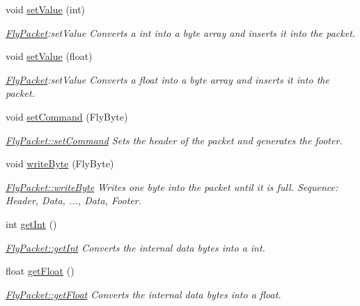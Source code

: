 \begin{DoxyCompactItemize}
void \hyperlink{class_fly_packet_ab3d6f9ed138f3938dc97a510e050f1dc}{set\+Value} (int)
\begin{DoxyCompactList}\small\item\em \hyperlink{class_fly_packet}{Fly\+Packet}\+:set\+Value Converts a int into a byte array and inserts it into the packet. \end{DoxyCompactList}\item 
void \hyperlink{class_fly_packet_a4735fdfc7443640f35b298f5798aab99}{set\+Value} (float)
\begin{DoxyCompactList}\small\item\em \hyperlink{class_fly_packet}{Fly\+Packet}\+:set\+Value Converts a float into a byte array and inserts it into the packet. \end{DoxyCompactList}\item 
void \hyperlink{class_fly_packet_aa0693a87a15559c8d88613463805c532}{set\+Command} (Fly\+Byte)
\begin{DoxyCompactList}\small\item\em \hyperlink{class_fly_packet_aa0693a87a15559c8d88613463805c532}{Fly\+Packet\+::set\+Command} Sets the header of the packet and generates the footer. \end{DoxyCompactList}\item 
void \hyperlink{class_fly_packet_ad0296d3260b26f33eb384dbf5421277a}{write\+Byte} (Fly\+Byte)
\begin{DoxyCompactList}\small\item\em \hyperlink{class_fly_packet_ad0296d3260b26f33eb384dbf5421277a}{Fly\+Packet\+::write\+Byte} Writes one byte into the packet until it is full. Sequence\+: Header, Data, ..., Data, Footer. \end{DoxyCompactList}\item 
int \hyperlink{class_fly_packet_a0a24a69f5c318d9579fac40ad5c7b502}{get\+Int} ()
\begin{DoxyCompactList}\small\item\em \hyperlink{class_fly_packet_a0a24a69f5c318d9579fac40ad5c7b502}{Fly\+Packet\+::get\+Int} Converts the internal data bytes into a int. \end{DoxyCompactList}\item 
float \hyperlink{class_fly_packet_a8987702368547e049b1f7ab8e979ce91}{get\+Float} ()
\begin{DoxyCompactList}\small\item\em \hyperlink{class_fly_packet_a8987702368547e049b1f7ab8e979ce91}{Fly\+Packet\+::get\+Float} Converts the internal data bytes into a float. \end{DoxyCompactList}\item 

\end{DoxyCompactItemize}
